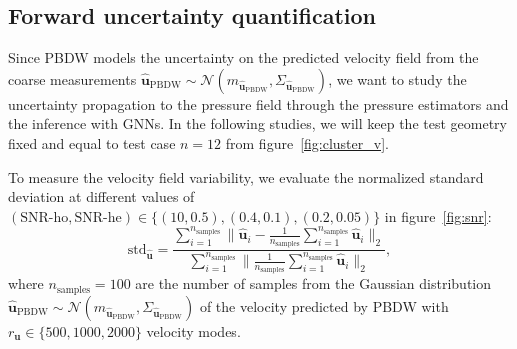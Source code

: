 \subsection{Forward uncertainty quantification}
\label{subsec:uqpressureestimators}
Since PBDW models the uncertainty on the predicted velocity field from the coarse measurements $\widehat{\mathbf{u}}_{\text{PBDW}}\sim\mathcal{N}(m_{\widehat{\mathbf{u}}_{\text{PBDW}}}, \Sigma_{\widehat{\mathbf{u}}_{\text{PBDW}}})$, we want to study the uncertainty propagation to the pressure field through the pressure estimators and the inference with GNNs. In the following studies, we will keep the test geometry fixed and equal to test case $n=12$ from figure~\ref{fig:cluster_v}.

To measure the velocity field variability, we evaluate the normalized standard deviation at different values of $(\text{SNR-ho}, \text{SNR-he})\in \{(10, 0.5), (0.4, 0.1), (0.2, 0.05)\}$ in figure~\ref{fig:snr}:
\begin{equation}
  \label{eq:std}
  \text{std}_{\widehat{\mathbf{u}}} = \frac{\sum^{n_{\text{samples}}}_{i=1} \lVert \widehat{\mathbf{u}}_i-\tfrac{1}{n_{\text{samples}}}\sum_{i=1}^{n_{\text{samples}}}\widehat{\mathbf{u}}_i\rVert_2}{\sum^{n_{\text{samples}}}_{i=1} \lVert \tfrac{1}{n_{\text{samples}}}\sum_{i=1}^{n_{\text{samples}}}\widehat{\mathbf{u}}_i\rVert_2},
\end{equation}
where $n_{\text{samples}}=100$ are the number of samples from the Gaussian distribution $\widehat{\mathbf{u}}_{\text{PBDW}}\sim\mathcal{N}(m_{\widehat{\mathbf{u}}_{\text{PBDW}}}, \Sigma_{\widehat{\mathbf{u}}_{\text{PBDW}}})$ of the velocity predicted by PBDW with $r_{\mathbf u}\in\{500, 1000, 2000\}$ velocity modes.

